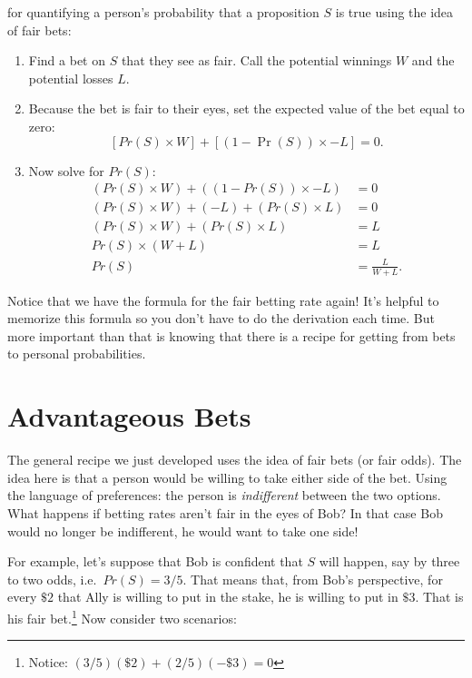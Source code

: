 \documentclass[]{tufte-book}
\providecommand{\tightlist}{%
  \setlength{\itemsep}{0pt}\setlength{\parskip}{0pt}}
\begin{document}
 for quantifying a person's probability that a proposition \(S\) is true using the idea of fair bets:

\begin{enumerate}
\def\labelenumi{\arabic{enumi}.}
\tightlist
\item
  Find a bet on \(S\) that they see as fair. Call the potential winnings \(W\) and the potential losses \(L\).
\item
  Because the bet is fair to their eyes, set the expected value of the bet equal to zero:
  \[ [Pr(S) \times W] + [(1-\Pr(S)) \times -L] = 0. \]
\item
  Now solve for \(Pr(S)\):
  \[
     \begin{aligned}
       (Pr(S) \times W)  + ((1-Pr(S)) \times -L) &= 0 \\
       (Pr(S) \times W)  + (-L) + (Pr(S) \times L) &= 0 \\
            (Pr(S) \times W) + (Pr(S) \times L) &= L \\
            Pr(S)\times (W + L) &= L \\
                                      Pr(S) &= \frac{L}{W+L}.
     \end{aligned}
   \]
\end{enumerate}

Notice that we have the formula for the fair betting rate again! It's helpful to memorize this formula so you don't have to do the derivation each time. But more important than that is knowing that there is a recipe for getting from bets to personal probabilities.

\hypertarget{advantageous-bets}{%
\section{Advantageous Bets}\label{advantageous-bets}}

The general recipe we just developed uses the idea of fair bets (or fair odds). The idea here is that a person would be willing to take either side of the bet. Using the language of preferences: the person is \emph{indifferent} between the two options. What happens if betting rates aren't fair in the eyes of Bob? In that case Bob would no longer be indifferent, he would want to take one side!

For example, let's suppose that Bob is confident that \(S\) will happen, say by three to two odds, i.e.~\(Pr(S)=3/5\). That means that, from Bob's perspective, for every \(\$2\) that Ally is willing to put in the stake, he is willing to put in \(\$3\). That is his fair bet.\footnote{Notice: \((3/5)(\$2) + (2/5)(-\$3) = 0\)} Now consider two scenarios:
\end{document}
